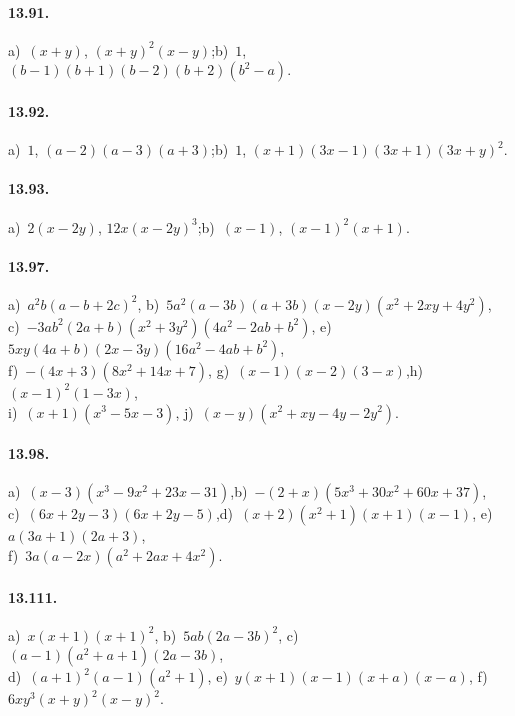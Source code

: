 \paragraph{13.91.}
a)~$(x+y)$, $(x+y)^2(x-y)$;\quad b)~$1$, $(b-1)(b+1)(b-2)(b+2)\left(b^2-a\right)$.

\paragraph{13.92.}
a)~$1$, $(a-2)(a-3)(a+3)$;\quad b)~$1$, $(x+1)(3x-1)(3x+1)(3x+y)^2$.

\paragraph{13.93.}
a)~$2(x-2y)$, $12x(x-2y)^3$;\quad b)~$(x-1)$, $(x-1)^2(x+1)$.

\paragraph{13.97.} a)~$a^{2}b(a-b+2c)^{2}$,\quad 
b)~$5a^{2}(a-3b)(a+3b)(x-2y)(x^{2}+2xy+4y^{2})$,\protect\\
c)~$-3{ab}^{2}(2a+b)(x^{2}+3y^{2})(4a^{2}-2{ab}+b^{2})$,\quad %
e)~$5xy(4a+b)(2x-3y)(16a^{2}-4{ab}+b^{2})$,\protect\\
f)~$-(4x+3)(8x^{2}+14x+7)$,\quad
g)~$(x-1)(x-2)(3-x)$,\quad h)~$(x-1)^{2}(1-3x)$,\protect\\
i)~$(x+1)(x^{3}-5x-3)$,\quad
j)~$(x-y)(x^{2}+xy-4y-2y^{2})$.

\paragraph{13.98.} a)~$(x-3)(x^{3}-9x^{2}+23x-31)$,\quad b)~$-(2+x)(5x^{3}+30x^{2}+60x+37)$,\protect\\
c)~$(6x+2y-3)(6x+2y-5)$,\quad d)~$(x+2)\left(x^{2}+1\right)(x+1)(x-1)$,\quad
e)~$a(3a+1)(2a+3)$,\protect\\ f)~$3a(a-2x)\left(a^{2}+2ax+4x^{2}\right)$.

\paragraph{13.111.}
a)~$x(x+1)(x+1)^{2}$,\quad 
b)~$5ab(2a-3b)^{2}$,\quad 
c)~$(a-1)\left(a^{2}+a+1\right)(2a-3b)$,\protect\\
d)~$(a+1)^{2}(a-1)\left(a^{2}+1\right)$,\quad 
e)~$y(x+1)(x-1)(x+a)(x-a)$,\quad 
f)~$6xy^{3}(x+y)^{2}(x-y)^{2}$.

